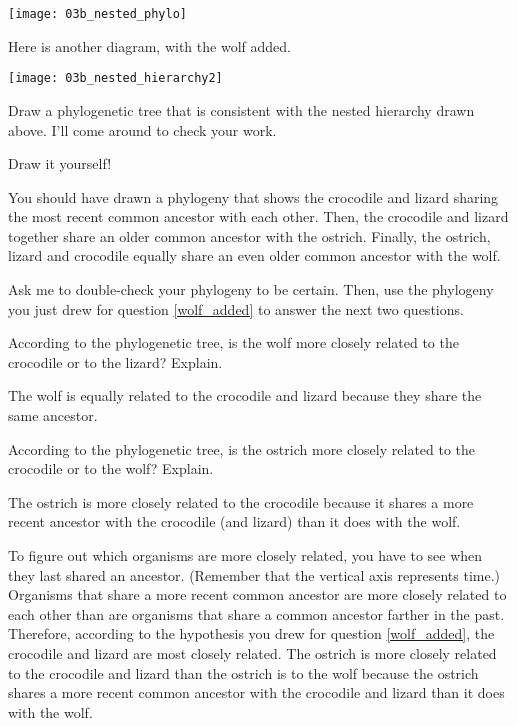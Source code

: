 \documentclass[12pt, hidelinks]{exam}
\newcommand*\AnswerBox[2]{%
    \parbox[t][#1]{0.92\textwidth}{%
    \begin{solution}#2\end{solution}}
}
\begin{document}
\begin{center}
	\noindent\texttt{[image: 03b\_nested\_phylo]}
\end{center}


Here is another diagram, with the wolf added.


\begin{center}
	\noindent\texttt{[image: 03b\_nested\_hierarchy2]}
\end{center}

\newpage

\begin{questions}
\setcounter{question}{4}

\question\label{wolf_added}
Draw a phylogenetic tree that is consistent with the nested
hierarchy drawn above. I'll come around to check your work.

\AnswerBox{10\baselineskip}{Draw it yourself!}

\end{questions}

You should have drawn a phylogeny that shows the crocodile and lizard
sharing the most recent common ancestor with each other. Then, the
crocodile and lizard together share an older common ancestor with the
ostrich. Finally, the ostrich, lizard and crocodile equally share an
even older common ancestor with the wolf.

Ask me to double-check your phylogeny to be certain. Then, use the
phylogeny you just drew for question \ref{wolf_added} to answer the next two
questions.

\begin{questions}
\setcounter{question}{5}

\question
According to the phylogenetic tree, is the wolf more closely
related to the crocodile or to the lizard? Explain.

\AnswerBox{4\baselineskip}{The wolf is equally related to the crocodile and
lizard because they share the same ancestor.}

\question
According to the phylogenetic tree, is the ostrich more
closely related to the crocodile or to the wolf? Explain.

\AnswerBox{4\baselineskip}{The ostrich is more closely related to the 
crocodile because it shares a more recent ancestor with the crocodile (and lizard)
than it does with the wolf.}

\end{questions}

To figure out which organisms are more closely related, you have to see
when they last shared an ancestor. (Remember that the vertical axis
represents time.) Organisms that share a more recent common ancestor are
more closely related to each other than are organisms that share a
common ancestor farther in the past. Therefore, according to the
hypothesis you drew for question \ref{wolf_added}, the crocodile and lizard are most
closely related. The ostrich is more closely related to the crocodile
and lizard than the ostrich is to the wolf because the ostrich shares a
more recent common ancestor with the crocodile and lizard than it does
with the wolf.
\end{document}
